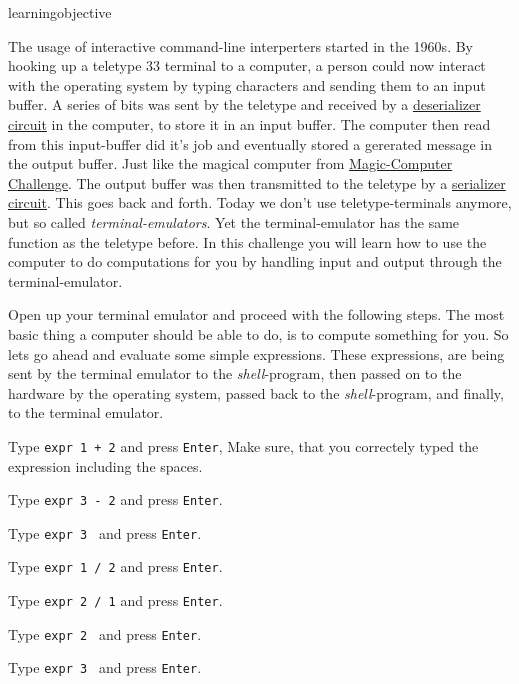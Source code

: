 learningobjective{}
\begin{challenge}
    \begin{chadescription}
        The usage of interactive command-line interperters started in the 1960s.
        By hooking up a teletype 33 terminal to a computer, a person could now interact with the operating system by typing characters and sending them to an input buffer.
        A series of bits was sent by the teletype and received by a \href{https://github.com/STEMgraph/}{deserializer circuit} in the computer, to store it in an input buffer.
        The computer then read from this input-buffer did it's job and eventually stored a gererated message in the output buffer.
        Just like the magical computer from \href{https://github.com/STEMgraph/}{Magic-Computer Challenge}.
        The output buffer was then transmitted to the teletype by a \href{https://github.com/STEMgraph/}{serializer circuit}.
        This goes back and forth. 
        Today we don't use teletype-terminals anymore, but so called \textit{terminal-emulators}.
        Yet the terminal-emulator has the same function as the teletype before. 
        In this challenge you will learn how to use the computer to do computations for you by handling input and output through the terminal-emulator.
    \end{chadescription}

    \begin{task}
        Open up your terminal emulator and proceed with the following steps.
        The most basic thing a computer should be able to do, is to compute something for you.
        So lets go ahead and evaluate some simple expressions.
        These expressions, are being sent by the terminal emulator to the \textit{shell}-program, then passed on to the hardware by the operating system, passed back to the \textit{shell}-program, and finally, to the terminal emulator.
        \begin{questions}
            \item Type \texttt{expr 1 + 2} and press \texttt{Enter}, Make sure, that you correctely typed the expression including the spaces.
            \item Type \texttt{expr 3 - 2} and press \texttt{Enter}.
            \item Type \texttt{expr 3 } and press \texttt{Enter}.
            \item Type \texttt{expr 1 / 2} and press \texttt{Enter}.
            \item Type \texttt{expr 2 / 1} and press \texttt{Enter}.
            \item Type \texttt{expr 2 } and press \texttt{Enter}.
            \item Type \texttt{expr 3 } and press \texttt{Enter}.
        \end{questions}
    \end{task}


\end{challenge}

